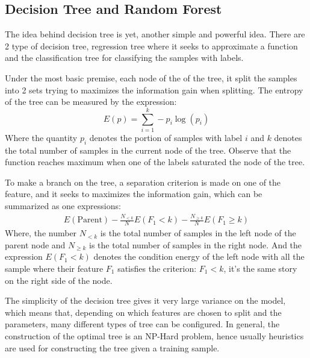 \documentclass{article}
\begin{document}
    \subsection*{Decision Tree and Random Forest}
        \hspace{1.1em}
        The idea behind decision tree is yet, another simple and powerful idea. There are 2 type of decision tree, regression tree where it seeks to approximate a function and the classification tree for classifying the samples with labels. 
        \par
        Under the most basic premise, each node of the of the tree, it split the samples into 2 sets trying to maximizes the information gain when splitting. The entropy of the tree can be measured by the expression: 
        \begin{equation*}\tag{9}\label{eqn:9}
            E(p) = \sum_{i = 1}^{k}-p_i\log(p_i)
        \end{equation*}
        Where the quantity $p_i$ denotes the portion of samples with label $i$ and $k$ denotes the total number of samples in the current node of the tree. Observe that the function reaches maximum when one of the labels saturated the node of the tree. 
        \par
        To make a branch on the tree, a separation criterion is made on one of the feature, and it seeks to maximizes the information gain, which can be summarized as one expressions: 
        \begin{align*}\tag{10}\label{eqn:10}
            E(\text{Parent}) -
            \frac{N_{<k}}{N}E(F_1 < k) - \frac{N_{\ge k}}{N}E(F_1\ge k)
        \end{align*}
        Where, the number $N_{<k}$ is the total number of samples in the left node of the parent node and $N_{\ge k}$ is the total number of samples in the right node. And the expression $E(F_1 < k)$ denotes the condition energy of the left node with all the sample where their feature $F_1$ satisfies the criterion: $F_1<k$, it's the same story on the right side of the node. 
        \par
        The simplicity of the decision tree gives it very large variance on the model, which means that, depending on which features are chosen to split and the parameters, many different types of tree can be configured. In general, the construction of the optimal tree is an NP-Hard problem, hence usually heuristics are used for constructing the tree given a training sample. %
\end{document}
